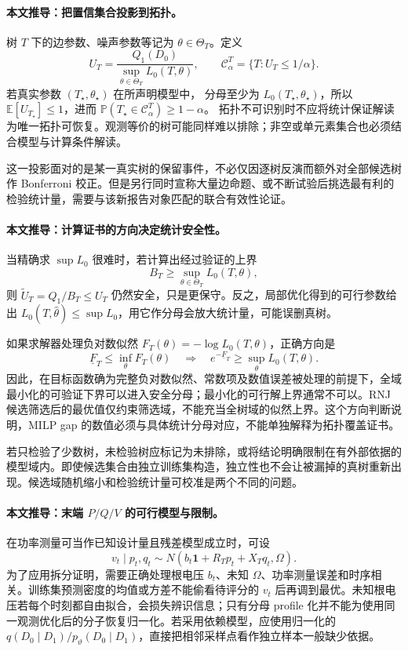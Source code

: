 \paragraph{本文推导：把置信集合投影到拓扑。}
树 $T$ 下的边参数、噪声参数等记为 $\theta\in\Theta_T$。定义
\[
 U_T=\frac{Q_1(D_0)}
 {\sup_{\theta\in\Theta_T}L_0(T,\theta)},\qquad
 \mathcal C^T_\alpha=\{T:U_T\le1/\alpha\}.
\]
若真实参数 $(T_\star,\theta_\star)$ 在所声明模型中，
分母至少为 $L_0(T_\star,\theta_\star)$，所以
$\mathbb E[U_{T_\star}]\le1$，进而
$\mathbb P(T_\star\in\mathcal C^T_\alpha)\ge1-\alpha$。
拓扑不可识别时不应将统计保证解读为唯一拓扑可恢复。观测等价的树可能同样难以排除；非空或单元素集合也必须结合模型与计算条件解读。

这一投影面对的是某一真实树的保留事件，不必仅因逐树反演而额外对全部候选树作 Bonferroni 校正。但是另行同时宣称大量边命题、或不断试验后挑选最有利的检验统计量，需要与该新报告对象匹配的联合有效性论证。

\paragraph{本文推导：计算证书的方向决定统计安全性。}
当精确求 $\sup L_0$ 很难时，若计算出经过验证的上界
\[
 B_T\ge\sup_{\theta\in\Theta_T}L_0(T,\theta),
\]
则 $\widetilde U_T=Q_1/B_T\le U_T$ 仍然安全，只是更保守。反之，局部优化得到的可行参数给出
$L_0(T,\widehat\theta)\le\sup L_0$，用它作分母会放大统计量，可能误删真树。

如果求解器处理负对数似然 $F_T(\theta)=-\log L_0(T,\theta)$，正确方向是
\[
 \underline F_T\le\inf_\theta F_T(\theta)
 \quad\Longrightarrow\quad
 e^{-\underline F_T}\ge\sup_\theta L_0(T,\theta).
\]
因此，在目标函数确为完整负对数似然、常数项及数值误差被处理的前提下，全域最小化的可验证下界可以进入安全分母；最小化的可行解上界通常不可以。RNJ 候选筛选后的最优值仅约束筛选域，不能充当全树域的似然上界。这个方向判断说明，MILP gap 的数值必须与具体统计分母对应，不能单独解释为拓扑覆盖证书。

若只检验了少数树，未检验树应标记为未排除，或将结论明确限制在有外部依据的模型域内。即使候选集合由独立训练集构造，独立性也不会让被漏掉的真树重新出现。候选域随机缩小和检验统计量可校准是两个不同的问题。

\paragraph{本文推导：末端 $P/Q/V$ 的可行模型与限制。}
在功率测量可当作已知设计量且残差模型成立时，可设
\[
 v_t\mid p_t,q_t
 \sim N\!\left(b_t\mathbf1+R_Tp_t+X_Tq_t,\Omega\right).
\]
为了应用拆分证明，需要正确处理根电压 $b_t$、未知 $\Omega$、功率测量误差和时序相关。训练集预测密度的均值或方差不能偷看待评分的 $v_t$ 后再调到最优。未知根电压若每个时刻都自由拟合，会损失辨识信息；只有分母 profile 化并不能为使用同一观测优化后的分子恢复归一化。若采用依赖模型，应使用归一化的
$q(D_0\mid D_1)/p_\vartheta(D_0\mid D_1)$，直接把相邻采样点看作独立样本一般缺少依据。

